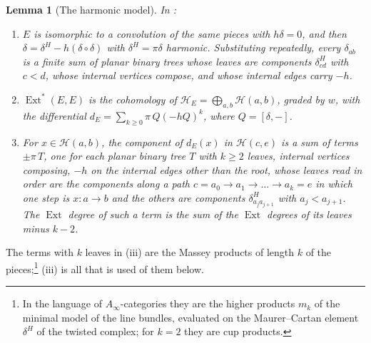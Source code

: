 \documentclass[11pt,reqno]{amsart}
\theoremstyle{plain}
\newtheorem{lemma}[theorem]{Lemma}
\theoremstyle{definition}
\theoremstyle{remark}
\newcommand{\cH}{\mathcal{H}}
\DeclareMathOperator{\Ext}{Ext}
\begin{document}
\begin{lemma}[The harmonic model]\label{lem:harmonicmodel}
In :
\begin{enumerate}[label=\textup{(\roman*)},leftmargin=2.6em,itemsep=2pt]
\item $E$ is isomorphic to a convolution of the same pieces with
  $h\delta=0$, and then $\delta=\delta^{H}-h(\delta\circ\delta)$ with
  $\delta^{H}=\pi\delta$ harmonic. Substituting repeatedly, every
  $\delta_{ab}$ is a finite sum of planar binary trees whose leaves are
  components $\delta^{H}_{cd}$ with $c<d$, whose internal vertices compose,
  and whose internal edges carry $-h$.
\item $\Ext^{*}(E,E)$ is the cohomology of
  $\cH_{E}=\bigoplus_{a,b}\cH(a,b)$, graded by $w$, with the differential
  $d_{E}=\sum_{k\ge0}\pi\,Q(-hQ)^{k}$, where $Q=[\delta,-]$.
\item For $x\in\cH(a,b)$, the component of $d_{E}(x)$ in $\cH(c,e)$ is a sum
  of terms $\pm\pi\,T$, one for each planar binary tree $T$ with $k\ge2$
  leaves, internal vertices composing, $-h$ on the internal edges other
  than the root, whose leaves read in order are the components along a path
  $c=a_{0}\to a_{1}\to\dots\to a_{k}=e$ in which one step is
  $x\colon a\to b$ and the others are components $\delta^{H}_{a_{j}a_{j+1}}$
  with $a_{j}<a_{j+1}$. The $\Ext$ degree of such a term is the sum of the
  $\Ext$ degrees of its leaves minus $k-2$.
\end{enumerate}
\end{lemma}

The terms with $k$ leaves in (iii) are the Massey products of length $k$ of
the pieces;\footnote{In the language of $A_{\infty}$-categories they are the
higher products $m_{k}$ of the minimal model of the line bundles, evaluated
on the Maurer--Cartan element $\delta^{H}$ of the twisted complex; for
$k=2$ they are cup products.} (iii) is all that is used of them below.
\end{document}
